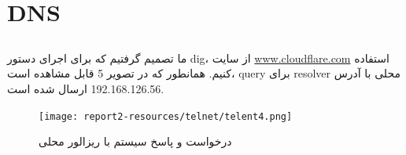 \documentclass[12pt]{article}
\begin{document}
	\section{DNS}
	\subsection{}
	ما تصمیم گرفتیم که برای اجرای دستور dig، از سایت \url{www.cloudflare.com} استفاده کنیم. همانطور که در تصویر 5 قابل مشاهده است، query برای resolver محلی با آدرس 192.168.126.56 ارسال شده است.
	\begin{figure}[h]
		\centering
		\texttt{[image: report2-resources/telnet/telent4.png]}
		\caption{درخواست و پاسخ سیستم با ریزالور محلی}
		\label{dns:1}
	\end{figure}
	
	
	\subsection{}
	

	
\end{document}
